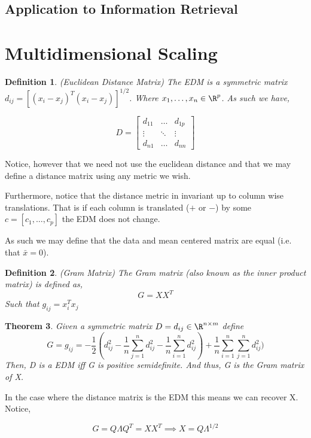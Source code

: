 \documentclass[twoside]{article}
\newtheorem{theorem}{Theorem}[section]
\newtheorem{definition}[theorem]{Definition}
\begin{document}
\subsection{Application to Information Retrieval}
\section{Multidimensional Scaling}

\begin{definition}(Euclidean Distance Matrix) The EDM is a symmetric matrix $d_{ij} = [(x_i - x_j)^T(x_i-x_j)]^{1/2}$. Where $x_1,\dots,x_n \in \R^p$. As such we have,

$$D = \begin{bmatrix}d_{11}&\hdots&d_{1p}\\\vdots&\ddots&\vdots\\d_{n1}&\hdots&d_{nn}\end{bmatrix}$$
\end{definition}

Notice, however that we need not use the euclidean distance and that we may define a distance matrix using any metric we wish.

Furthermore, notice that the distance metric in invariant up to column wise translations. That is if each column is translated ($+$ or $-$) by some $c = [c_1,\dots,c_p]$ the EDM does not change. 

As such we may define that the data and mean centered matrix are equal (i.e. that $\bar{x}=0$). 

\begin{definition}(Gram Matrix) The Gram matrix (also known as the inner product matrix) is defined as, $$G = XX^T$$
Such that $g_{ij}=x_i^Tx_j$
\end{definition}

\begin{theorem} Given a symmetric matrix $D = d_{ij} \in \R^{n\times m}$ define $$G=g_{ij} = -\frac{1}{2}(d_{ij}^2 - \frac{1}{n}\sum^n_{j=1}d_{ij}^2 - \frac{1}{n}\sum^n_{i=1}d_{ij}^2) + \frac{1}{n}\sum^n_{i=1}\sum^n_{j=1}d_{ij}^2)$$
Then, D is a EDM iff G is positive semidefinite. And thus, G is the Gram matrix of X. 
\end{theorem}

In the case where the distance matrix is the EDM this means we can recover X. Notice,

$$G = Q\Lambda Q^T = XX^T \implies X = Q\Lambda^{1/2}$$

\end{document}
